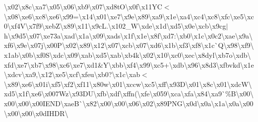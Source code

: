 \begin{DoxyCompactItemize}
\textbackslash{}x02\textbackslash{}x8c\textbackslash{}xa7\textbackslash{}x05\textbackslash{}x06\textbackslash{}xb9\textbackslash{}x07\textbackslash{}xd8t\+O\textbackslash{}x0f\textbackslash{}x11\+Y\+C$<$\textbackslash{}x08\textbackslash{}xe6\textbackslash{}xc8\textbackslash{}xe6\textbackslash{}x99=\textbackslash{}x14\textbackslash{}x01\textbackslash{}xe7\textbackslash{}x9e\textbackslash{}x89\textbackslash{}xa9\textbackslash{}x1e\textbackslash{}xa4\textbackslash{}xc4\textbackslash{}xc8\textbackslash{}xfc\textbackslash{}xe5\textbackslash{}xc0\textbackslash{}xf4\+V\textbackslash{}x7f9\textbackslash{}xeb\+Z\textbackslash{}x89\textquotesingle{}\textbackslash{}x11\textbackslash{}x9c\+L.\textbackslash{}x102\+\_\+\+W\textbackslash{}xde\textbackslash{}x1d\textbackslash{}xd5\textbackslash{}x0e\textbackslash{}xcb\textbackslash{}x9cg$\vert$h\textbackslash{}x9d5\textbackslash{}x07\textbackslash{}xe73a\textbackslash{}xad\textbackslash{}x1a\textbackslash{}x09\textbackslash{}xads\textbackslash{}x1f\textbackslash{}x1e\textbackslash{}x8f\textbackslash{}xd7\+:\textbackslash{}xb0\textbackslash{}x1c\textbackslash{}x0c2\textbackslash{}xae\textbackslash{}x9a\textbackslash{}xf6\textbackslash{}x9e\textbackslash{}x07j\textbackslash{}x00\+P\textbackslash{}x02\textbackslash{}x89\textbackslash{}x12\textbackslash{}x07\textbackslash{}xcb\textbackslash{}x07\textbackslash{}xd6\textbackslash{}x1b\textbackslash{}xf3\textbackslash{}xf8\textbackslash{}x1c\`{}\+Q\textbackslash{}x98\textbackslash{}xf9\textbackslash{}x1ab\textbackslash{}x0b\textbackslash{}xf0\+S\textbackslash{}xdc\textbackslash{}x09\textbackslash{}xab\textbackslash{}xd5\textbackslash{}xab\textbackslash{}xb4k\textbackslash{}x02\textbackslash{}x10\textbackslash{}xc0\textbackslash{}xec\textbackslash{}x8dyl\textbackslash{}xb7o\textbackslash{}xdb\textbackslash{}xfd\textbackslash{}xe7\textbackslash{}xb7\textbackslash{}x98\textbackslash{}xc6\textbackslash{}xe7\textbackslash{}xd1\&\+Y\textbackslash{}xbb\textbackslash{}xf4\textbackslash{}x99\textbackslash{}xc5+\textbackslash{}xdb\textbackslash{}x96\textbackslash{}x8d3\textbackslash{}xfbvkd\textbackslash{}x1e\textbackslash{}xdcv\textbackslash{}xa9,\textbackslash{}x12\textbackslash{}xe5\textbackslash{}xcf\textbackslash{}xfeu\textbackslash{}xb0?\textbackslash{}x1c\textbackslash{}xab$<$\textbackslash{}x89\textbackslash{}xe6\textbackslash{}x01i\textbackslash{}xf5\textbackslash{}xf2\textbackslash{}xf11\textbackslash{}x80w\textbackslash{}x01\textbackslash{}xccw\textbackslash{}xc5\textbackslash{}xff\textbackslash{}x93\+D\textbackslash{}x01\textbackslash{}x8c\textbackslash{}x01\textbackslash{}xdc\+W\textbackslash{}xd5\textbackslash{}x1f\textbackslash{}xe6\textbackslash{}x007\+Wz\textbackslash{}x93\+D\+U\textbackslash{}xfb\textbackslash{}xdf\textbackslash{}xffn(\textbackslash{}xfe\textbackslash{}x059\textbackslash{}xca\textbackslash{}xfa\textbackslash{}x84\textbackslash{}xa9\`{}\%\+B\textbackslash{}x00\textbackslash{}x00\textbackslash{}x00\textbackslash{}x00\+I\+E\+N\+D\textbackslash{}xae\+B\`{}\textbackslash{}x82\textbackslash{}x00\textbackslash{}x00\textbackslash{}x06\textbackslash{}x02\textbackslash{}x89\+P\+N\+G\textbackslash{}x0d\textbackslash{}x0a\textbackslash{}x1a\textbackslash{}x0a\textbackslash{}x00\textbackslash{}x00\textbackslash{}x00\textbackslash{}x0d\+I\+H\+D\+R\textbackslash
\end{DoxyCompactItemize}
